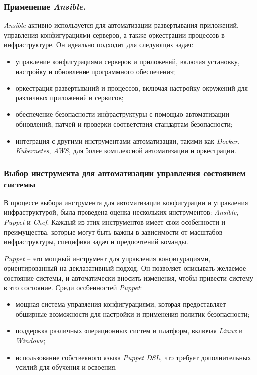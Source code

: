 \subsubsection{Применение \textit{Ansible}.}
\textit{Ansible} активно используется для автоматизации развертывания приложений, управления конфигурациями серверов, а также оркестрации процессов в инфраструктуре. Он идеально подходит для следующих задач:
\begin{itemize}
    \item управление конфигурациями серверов и приложений, включая установку, настройку и обновление программного обеспечения;
    \item оркестрация развертываний и процессов, включая настройку окружений для различных приложений и сервисов;
    \item обеспечение безопасности инфраструктуры с помощью автоматизации обновлений, патчей и проверки соответствия стандартам безопасности;
    \item интеграция с другими инструментами автоматизации, такими как \textit{Docker}, \textit{Kubernetes}, \textit{AWS}, для более комплексной автоматизации и оркестрации.
\end{itemize}

\subsubsection{Выбор инструмента для автоматизации управления состоянием системы}
В процессе выбора инструмента для автоматизации конфигурации и управления инфраструктурой, была проведена оценка нескольких инструментов: \textit{Ansible}, \textit{Puppet} и \textit{Chef}. Каждый из этих инструментов имеет свои особенности и преимущества, которые могут быть важны в зависимости от масштабов инфраструктуры, специфики задач и предпочтений команды.


\textit{Puppet} -- это мощный инструмент для управления конфигурациями, ориентированный на декларативный подход. Он позволяет описывать желаемое состояние системы, и автоматически вносить изменения, чтобы привести систему в это состояние. Среди особенностей \textit{Puppet}:
\begin{itemize}
    \item мощная система управления конфигурациями, которая предоставляет обширные возможности для настройки и применения политик безопасности;
    \item поддержка различных операционных систем и платформ, включая \textit{Linux} и \textit{Windows};
    \item использование собственного языка \textit{Puppet DSL}, что требует дополнительных усилий для обучения и освоения.
\end{itemize}

